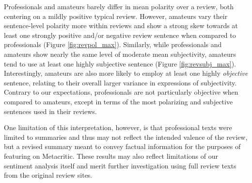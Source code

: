 \documentclass[letterpaper]{article}
\begin{document}
Professionals and amateurs barely differ in mean polarity over a review, both centering on a mildly positive typical review. However, amateurs vary their sentence-level polarity more within reviews and show a strong skew towards at least one strongly positive and/or negative review sentence when compared to professionals (Figure \ref{fig:revpol_max}). Similarly, while professionals and amateurs show nearly the same level of moderate mean subjectivity, amateurs tend to use at least one highly subjective sentence (Figure \ref{fig:revsubj_max}). Interestingly, amateurs are also more likely to employ at least one highly \textit{objective} sentence, relating to their overall larger variance in expressions of subjectivity. Contrary to our expectations, professionals are not particularly objective when compared to amateurs, except in terms of the most polarizing and subjective sentences used in their reviews.

One limitation of this interpretation, however, is that professional texts were limited to summaries and thus may not reflect the intended valence of the review, but a revised summary meant to convey factual information for the purposes of featuring on Metacritic. These results may also reflect limitations of our sentiment analysis itself and merit further investigation using full review texts from the original review sites.
\end{document}

